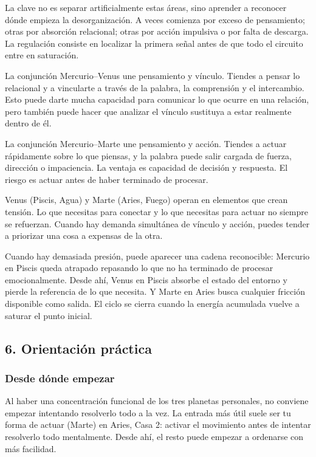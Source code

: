 \documentclass[11pt,a4paper]{article}
\begin{document}
La clave no es separar artificialmente estas áreas, sino aprender a reconocer dónde empieza la desorganización. A veces comienza por exceso de pensamiento; otras por absorción relacional; otras por acción impulsiva o por falta de descarga. La regulación consiste en localizar la primera señal antes de que todo el circuito entre en saturación.

La conjunción Mercurio–Venus une pensamiento y vínculo. Tiendes a pensar lo relacional y a vincularte a través de la palabra, la comprensión y el intercambio. Esto puede darte mucha capacidad para comunicar lo que ocurre en una relación, pero también puede hacer que analizar el vínculo sustituya a estar realmente dentro de él.

La conjunción Mercurio–Marte une pensamiento y acción. Tiendes a actuar rápidamente sobre lo que piensas, y la palabra puede salir cargada de fuerza, dirección o impaciencia. La ventaja es capacidad de decisión y respuesta. El riesgo es actuar antes de haber terminado de procesar.

Venus (Piscis, Agua) y Marte (Aries, Fuego) operan en elementos que crean tensión. Lo que necesitas para conectar y lo que necesitas para actuar no siempre se refuerzan. Cuando hay demanda simultánea de vínculo y acción, puedes tender a priorizar una cosa a expensas de la otra.

Cuando hay demasiada presión, puede aparecer una cadena reconocible: Mercurio en Piscis queda atrapado repasando lo que no ha terminado de procesar emocionalmente. Desde ahí, Venus en Piscis absorbe el estado del entorno y pierde la referencia de lo que necesita. Y Marte en Aries busca cualquier fricción disponible como salida. El ciclo se cierra cuando la energía acumulada vuelve a saturar el punto inicial.

\vspace{0.8cm}

\subsection{6. Orientación práctica}

\subsubsection*{Desde dónde empezar}

\RaggedRight
Al haber una concentración funcional de los tres planetas personales, no conviene empezar intentando resolverlo todo a la vez. La entrada más útil suele ser tu forma de actuar (Marte) en Aries, Casa 2: activar el movimiento antes de intentar resolverlo todo mentalmente. Desde ahí, el resto puede empezar a ordenarse con más facilidad.
\end{document}
